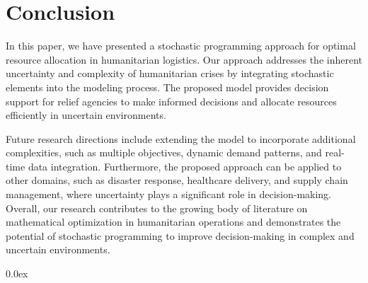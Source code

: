 \documentclass[opre,sglanonrev]{informs4}
\begin{document}
\section{Conclusion}\label{sec:Conclusion}
In this paper, we have presented a stochastic programming approach for optimal resource allocation in humanitarian logistics. Our approach addresses the inherent uncertainty and complexity of humanitarian crises by integrating stochastic elements into the modeling process. The proposed model provides decision support for relief agencies to make informed decisions and allocate resources efficiently in uncertain environments.

Future research directions include extending the model to incorporate additional complexities, such as multiple objectives, dynamic demand patterns, and real-time data integration. Furthermore, the proposed approach can be applied to other domains, such as disaster response, healthcare delivery, and supply chain management, where uncertainty plays a significant role in decision-making. Overall, our research contributes to the growing body of literature on mathematical optimization in humanitarian operations and demonstrates the potential of stochastic programming to improve decision-making in complex and uncertain environments.

\begingroup \parindent 0pt \parskip 0.0ex \def\enotesize{\normalsize} \theendnotes \endgroup

%
%
%

\end{document}
